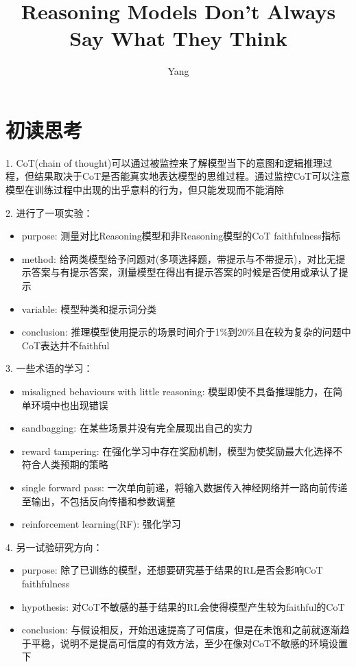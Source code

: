 \documentclass[a4paper,12pt]{article}
\title{Reasoning Models Don’t Always Say What They Think}
\author{Yang}
\begin{document}
\maketitle
\section{初读思考}
1. CoT(chain of thought)可以通过被监控来了解模型当下的意图和逻辑推理过程，但结果取决于CoT是否能真实地表达模型的思维过程。通过监控CoT可以注意模型在训练过程中出现的出乎意料的行为，但只能发现而不能消除

2. 进行了一项实验：
\begin{itemize}
    \item purpose: 测量对比Reasoning模型和非Reasoning模型的CoT faithfulness指标
    \item method: 给两类模型给予问题对(多项选择题，带提示与不带提示)，对比无提示答案与有提示答案，测量模型在得出有提示答案的时候是否使用或承认了提示
    \item variable: 模型种类和提示词分类
    \item conclusion: 推理模型使用提示的场景时间介于1\%到20\%且在较为复杂的问题中CoT表达并不faithful
\end{itemize}

3. 一些术语的学习：
\begin{itemize}
    \item misaligned behaviours with little reasoning: 模型即使不具备推理能力，在简单环境中也出现错误
    \item sandbagging: 在某些场景并没有完全展现出自己的实力
    \item reward tampering: 在强化学习中存在奖励机制，模型为使奖励最大化选择不符合人类预期的策略
    \item single forward pass: 一次单向前递，将输入数据传入神经网络并一路向前传递至输出，不包括反向传播和参数调整
    \item reinforcement learning(RF): 强化学习
\end{itemize}

4. 另一试验研究方向：
\begin{itemize}
    \item purpose: 除了已训练的模型，还想要研究基于结果的RL是否会影响CoT faithfulness
    \item hypothesis: 对CoT不敏感的基于结果的RL会使得模型产生较为faithful的CoT
    \item conclusion: 与假设相反，开始迅速提高了可信度，但是在未饱和之前就逐渐趋于平稳，说明不是提高可信度的有效方法，至少在像对CoT不敏感的环境设置下
\end{itemize}
\end{document}
